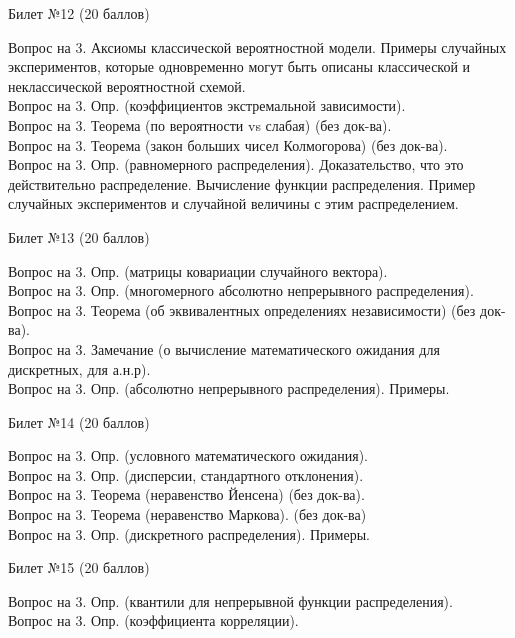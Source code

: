 \documentclass[preview]{standalone}
\begin{document}
\begin{center} {\Large Билет №12 (20 баллов)} \end{center}
Вопрос на 3.  Аксиомы классической вероятностной модели. Примеры случайных экспериментов, которые одновременно могут быть описаны классической и неклассической вероятностной схемой. \\
Вопрос на 3.  Опр. (коэффициентов экстремальной зависимости). \\
Вопрос на 3. Теорема (по вероятности vs слабая) (без док-ва). \\  
Вопрос на 3.  Теорема (закон больших чисел Колмогорова) (без док-ва). \\
Вопрос на 3.  Опр. (равномерного распределения). Доказательство, что это действительно распределение. Вычисление функции распределения. Пример случайных экспериментов и случайной величины с этим распределением. \\
\begin{center} {\Large Билет №13 (20 баллов)} \end{center}
Вопрос на 3.  Опр. (матрицы ковариации случайного вектора). \\
Вопрос на 3.  Опр. (многомерного абсолютно непрерывного распределения). \\
Вопрос на 3.  Теорема (об эквивалентных определениях независимости) (без док-ва). \\
Вопрос на 3.  Замечание (о вычисление  математического ожидания для дискретных, для а.н.р). \\
Вопрос на 3. Опр. (абсолютно непрерывного распределения). Примеры. \\
\begin{center} {\Large Билет №14 (20 баллов)} \end{center}
Вопрос на 3.  Опр. (условного математического ожидания). \\
Вопрос на 3.  Опр. (дисперсии, стандартного отклонения). \\ 
Вопрос на 3.  Теорема (неравенство Йенсена) (без док-ва). \\
Вопрос на 3.  Теорема (неравенство Маркова). (без док-ва) \\
Вопрос на 3. Опр. (дискретного распределения). Примеры. \\
\begin{center} {\Large Билет №15 (20 баллов)} \end{center}
Вопрос на 3.    Опр. (квантили для непрерывной функции распределения). \\
Вопрос на 3.  Опр. (коэффициента корреляции). \\
\end{document}
